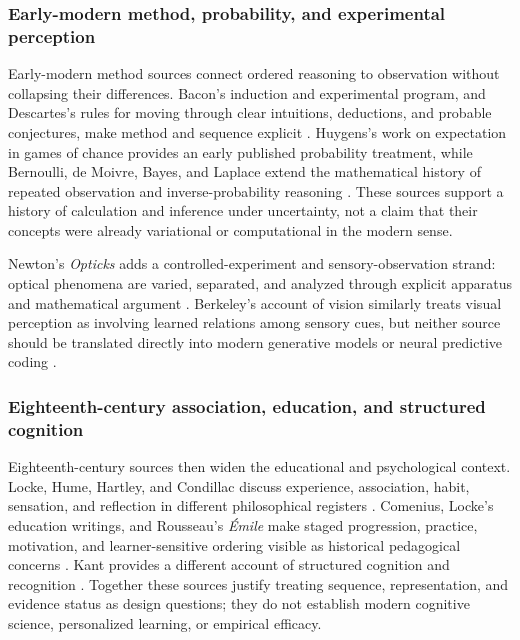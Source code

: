 \documentclass[
  english,
]{article}
\begin{document}
\subsubsection{Early-modern method, probability, and experimental
perception}\label{early-modern-method-probability-and-experimental-perception}

Early-modern method sources connect ordered reasoning to observation
without collapsing their differences. Bacon's induction and experimental
program, and Descartes's rules for moving through clear intuitions,
deductions, and probable conjectures, make method and sequence explicit
\citep{bacon1620novum_organum, descartes1628rules_direction_mind}.
Huygens's work on expectation in games of chance provides an early
published probability treatment, while Bernoulli, de Moivre, Bayes, and
Laplace extend the mathematical history of repeated observation and
inverse-probability reasoning
\citep{huygens1657ratiociniis, bernoulli1713ars_conjectandi, demoivre1718doctrine_chances, bayes1763doctrine_chances, laplace1774inverse_probability}.
These sources support a history of calculation and inference under
uncertainty, not a claim that their concepts were already variational or
computational in the modern sense.

Newton's \emph{Opticks} adds a controlled-experiment and
sensory-observation strand: optical phenomena are varied, separated, and
analyzed through explicit apparatus and mathematical argument
\citep{newton1704opticks}. Berkeley's account of vision similarly treats
visual perception as involving learned relations among sensory cues, but
neither source should be translated directly into modern generative
models or neural predictive coding
\citep{berkeley1709new_theory_vision}.

\subsubsection{Eighteenth-century association, education, and structured
cognition}\label{eighteenth-century-association-education-and-structured-cognition}

Eighteenth-century sources then widen the educational and psychological
context. Locke, Hume, Hartley, and Condillac discuss experience,
association, habit, sensation, and reflection in different philosophical
registers
\citep{locke1690essay, hume1739treatise, hume1748enquiry, hartley1749observations, condillac1754sensations}.
Comenius, Locke's education writings, and Rousseau's \emph{Émile} make
staged progression, practice, motivation, and learner-sensitive ordering
visible as historical pedagogical concerns
\citep{comenius1657great_didactic, locke1693education, rousseau1762emile}.
Kant provides a different account of structured cognition and
recognition \citep{kant1781critique_pure_reason}. Together these sources
justify treating sequence, representation, and evidence status as design
questions; they do not establish modern cognitive science, personalized
learning, or empirical efficacy.
\end{document}
